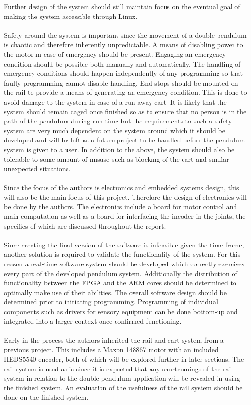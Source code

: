 Further design of the system should still maintain focus on the eventual goal of making the system accessible through Linux.
\\~\\
Safety around the system is important since the movement of a double pendulum is chaotic and therefore inherently unpredictable.
A means of disabling power to the motor in case of emergency should be present.  
Engaging an emergency condition should be possible both manually and automatically.
The handling of emergency conditions should happen independently of any programming so that faulty programming cannot disable handling.
End stops should be mounted on the rail to provide a means of generating an emergency condition.
This is done to avoid damage to the system in case of a run-away cart.
It is likely that the system should remain caged once finished so as to ensure that no person is in the path of the pendulum during run-time but the requirements to such a safety system are very much dependent on the system around which it should be developed and will be left as a future project to be handled before the pendulum system is given to a user.
In addition to the above, the system should also be tolerable to some amount of misuse such as blocking of the cart and similar unexpected situations.
\\~\\
Since the focus of the authors is electronics and embedded systems design, this will also be the main focus of this project.
Therefore the design of electronics will be done by the authors. 
The electronics include a board for motor control and main computation as well as a board for interfacing the incoder in the joints, the specifics of which are discussed throughout the report.
\\~\\
Since creating the final version of the software is infeasible given the time frame, another solution is required to validate the functionality of the system.
For this reason a real-time software system should be developed which correctly exercises every part of the developed pendulum system.
Additionally the distribution of functionality between the FPGA and the ARM cores should be determined to optimally make use of their abilities.
The overall software design should be determined prior to initiating programming.
Programming of individual components such as drivers for sensory equipment can be done bottom-up and integrated into a larger context once confirmed functioning.
\\~\\
Early in the process the authors inherited the rail and cart system from a previous project.
This includes a Maxon 148867 motor with an included HEDS5540 encoder, both of which will be explored further in later sections.
The rail system is used as-is since it is expected that any shortcomings of the rail system in relation to the double pendulum application will be revealed in using the finished system.
An evaluation of the usefulness of the rail system should be done on the finished system.

